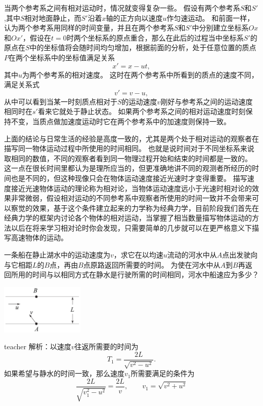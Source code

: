 当两个参考系之间有相对运动时，情况就变得复杂一些。
假设有两个参考系$S$和$S'$,其中$S$相对地面静止，而$S'$沿着$x$轴的正方向以速度$u$作匀速运动。
和前面一样，认为两个参考系用同样的时间变量，并且在两个参考系$S$和$S'$中分别建立坐标系$Ox$和$Ox'$，假设在$t=0$时两个坐标系的原点重合，那么在此后的过程当中坐标系$S'$的原点在$S$中的坐标值将会随时间均匀增加，根据前面的分析，处于任意位置的质点$P$在两个坐标系中的坐标值满足关系
\begin{equation}\label{eqn: motion-伽利略空间变换}
x' = x-ut,
\end{equation}
其中$u$为两个参考系的相对速度。
这时在两个参考系中所看到的质点的速度不同，满足关系式
\begin{equation}
v' = v-u,
\end{equation}
从中可以看到当某一时刻质点相对于$S$的运动速度$v$刚好与参考系之间的运动速度相同时在$s'$看来它就处于静止状态。
如果两个参考系之间的相对运动速度时刻保持不变，当质点做加速度运动时它在两个参考系中的加速度则保持一致。

上面的结论与日常生活的经验是高度一致的，尤其是两个处于相对运动的观察者在描写同一物体运动过程中所使用的时间相同。
也就是说时间对于不同坐标系来说取相同的数值，不同的观察者看到同一物理过程开始和结束的时间都是一致的。
这一点在很长时间里都认为是理所应当的，但更准确地讲不同的观测者所经历的时间也是不同的，但这种现像只会在物体运动速度接近光速时才变得重要。
描写速度接近光速物体运动的理论称为{\heiti 相对论}，当物体运动速度远小于光速时相对论的效果非常微弱，假设相对运动的不同参考系中观察者所使用的时间一致并不会带来可以察觉的效果，基于这个条件建立起来的力学称为{\heiti 经典力学}，目前阶段我们首先在经典力学的框架内讨论各个物体的相对运动，当掌握了相当数量描写物体运动的方法以后在将来学习相对论时你会发现，只需要简单的几步就可以在更严格意义下描写高速物体的运动。


\begin{example}
一条船在静止湖水中的运动速度为$v$，求它在以均速$u$流动的河水中从$A$点出发驶向与它相距$L$的$B$点，再由$B$点原路返回所需要的时间。
为使在河水中从$A$到$B$再返回所用的时间与以相同方式在静水是行驶所需的时间相同，河水中船速应为多少？
\begin{flushright}
\includegraphics[width = 0.3\textwidth]{images/motion-39.pdf} 
\end{flushright}
\begin{taggedblock}{teacher}
\vspace*{3cm}
\noindent
解析：以速度$v$往返所需要的时间为
\[
T_1 = \frac{2L}{\sqrt{v^2-u^2}}.
\]
如果希望与静水的时间一致，那么速度$v_1$所需要满足的条件为
\[
\frac{2L}{\sqrt{v_1^2-u^2}} = \frac{2L}{v},\qquad v_1 = \sqrt{v^2+u^2}
\]
\end{taggedblock}
\end{example}



